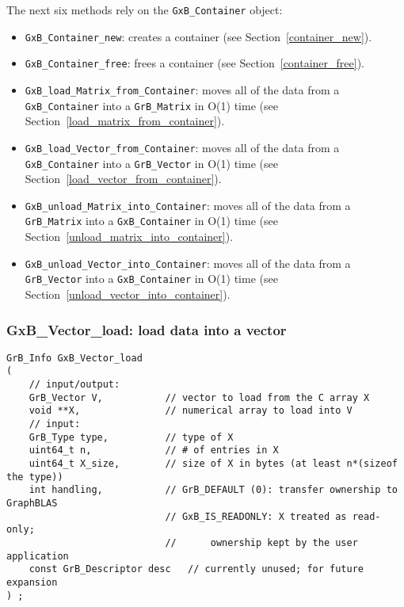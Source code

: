 The next six methods rely on the \verb'GxB_Container' object:

\begin{itemize}
\item \verb'GxB_Container_new': creates a container
    (see Section~\ref{container_new}).

\item \verb'GxB_Container_free': frees a container
    (see Section~\ref{container_free}).

\item \verb'GxB_load_Matrix_from_Container': moves all of the data from a
    \verb'GxB_Container' into a \verb'GrB_Matrix' in O(1) time
    (see Section~\ref{load_matrix_from_container}).

\item \verb'GxB_load_Vector_from_Container': moves all of the data from a
    \verb'GxB_Container' into a \verb'GrB_Vector' in O(1) time
    (see Section~\ref{load_vector_from_container}).

\item \verb'GxB_unload_Matrix_into_Container': moves all of the data from
    a \verb'GrB_Matrix' into a \verb'GxB_Container' in O(1) time
    (see Section~\ref{unload_matrix_into_container}).

\item \verb'GxB_unload_Vector_into_Container': moves all of the data from
    a \verb'GrB_Vector' into a \verb'GxB_Container' in O(1) time
    (see Section~\ref{unload_vector_into_container}).

\end{itemize}

\subsubsection{{\sf GxB\_Vector\_load:} load data into a vector}
\label{vector_load}

\begin{mdframed}[userdefinedwidth=6in]
{\footnotesize
\begin{verbatim}
GrB_Info GxB_Vector_load
(
    // input/output:
    GrB_Vector V,           // vector to load from the C array X
    void **X,               // numerical array to load into V
    // input:
    GrB_Type type,          // type of X
    uint64_t n,             // # of entries in X
    uint64_t X_size,        // size of X in bytes (at least n*(sizeof the type))
    int handling,           // GrB_DEFAULT (0): transfer ownership to GraphBLAS
                            // GxB_IS_READONLY: X treated as read-only;
                            //      ownership kept by the user application
    const GrB_Descriptor desc   // currently unused; for future expansion
) ;
\end{verbatim}
} \end{mdframed}

